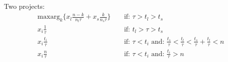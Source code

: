\documentclass[12pt]{report}
\numberwithin{equation}{section}
\begin{document}
Two projects:
\begin{align*}
& \text{maxarg}_k \{ x_l\frac{n-k}{n_l \tau}+x_s\frac{k}{n_s \tau} \}  && \text{ if: } \tau > t_l>t_s \\
&x_i \frac{1}{\tau} && \text{ if: } t_l> \tau > t_s \\
&x_i \frac{t_i}{\tau} && \text{ if: } \tau < t_i \text{  and: } \frac{t_s}{\tau}<\frac{t_l}{\tau}<\frac{t_s}{\tau}+\frac{t_l}{\tau}<n \\
&x_i \frac{n}{\tau} && \text{ if: } \tau < t_i \text{  and: } \frac{t_i}{\tau}>n
\end{align*}



\end{document}
